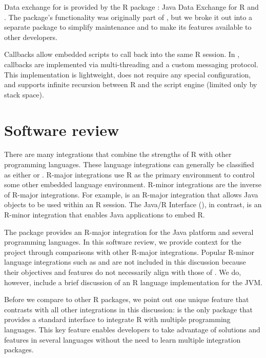 Data exchange for  is provided by the R package : Java Data Exchange for R and  \citep{jdx}. The  package's functionality was originally part of , but we broke it out into a separate package to simplify maintenance and to make its features available to other developers. %

Callbacks allow embedded scripts to call back into the same R session. In , callbacks are implemented via multi-threading and a custom messaging protocol. This implementation is lightweight, does not require any special configuration, and supports infinite recursion between R and the script engine (limited only by stack space).

\hypertarget{software-review}{}
\section{Software review}

There are many integrations that combine the strengths of R with other programming languages. These language integrations can generally be classified as either  or . R-major integrations use R as the primary environment to control some other embedded language environment. R-minor integrations are the inverse of R-major integrations. For example,  is an R-major integration that allows Java objects to be used within an R session. The Java/R Interface (), in contrast, is an R-minor integration that enables Java applications to embed R.

The  package provides an R-major integration for the Java platform and several programming languages. In this software review, we provide context for the  project through comparisons with other R-major integrations. Popular R-minor language integrations such as  \citep{rserve} and  \citep{opencpu} are not included in this discussion because their objectives and features do not necessarily align with those of . We do, however, include a brief discussion of an R language implementation for the JVM.

Before we compare  to other R packages, we point out one unique feature that contrasts  with all other integrations in this discussion:  is the only package that provides a standard interface to integrate R with multiple programming languages. This key feature enables developers to take advantage of solutions and features in several languages without the need to learn multiple integration packages.


